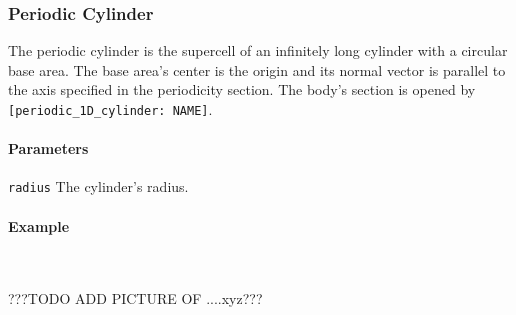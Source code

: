 \subsubsection{Periodic Cylinder}
The periodic cylinder is the supercell of an infinitely long cylinder with a circular base area. The base area's center is the origin and its normal vector is parallel to the axis specified in the periodicity section. The body's section is opened by \lstinline{[periodic_1D_cylinder: NAME]}.

\paragraph{Parameters}
\begin{description}
 \item{\lstinline{radius}} The cylinder's radius.
\end{description}

\paragraph{Example}\ 


???TODO ADD PICTURE OF ....xyz???